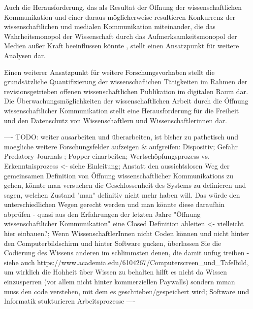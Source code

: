 Auch die Herausforderung, das als Resultat der Öffnung der wissenschaftlichen Kommunikation und einer daraus möglicherweise resultieren Konkurrenz der wissenschaftlichen und medialen Kommunikation miteinander, die das Wahrheitsmonopol der Wissenschaft durch das Aufmerksamkeitsmonopol der Medien außer Kraft beeinflussen könnte \cite{weingart_2005_wissenschaft}, stellt einen Ansatzpunkt für weitere Analysen dar.

Einen weiterer Ansatzpunkt für weitere Forschungsvorhaben stellt die grundsätzliche Quantifizierung der wissenschaflichen Tätigkeiten im Rahmen der revisionsgetrieben offenen wissenschaftlichen Publikation im digitalen Raum dar. Die Überwachungsmöglichkeiten der wissenschaftlichen Arbeit durch die Öffnung wissenschaftlicher Kommunikation stellt eine Herausforderung für die Freiheit und den Datenschutz von Wissenschaftlern und Wissenschaftlerinnen dar.

---- TODO: weiter ausarbeiten und überarbeiten, ist bisher zu pathetisch und moegliche weitere Forschungsfelder aufzeigen & aufgreifen: Dispositiv; Gefahr Predatory Journals \cite{Beall_2012}; Popper einarbeiten; Wertschöpfungsprozess vs. Erkenntnisprozess <- siehe Einleitung; Anstatt den aussichtslosen Weg der gemeinsamen Definition von Öffnung wissenschaftlicher Kommunikations zu gehen, könnte man versuchen die Geschlossenheit des Systems zu definieren und sagen, welchen Zustand "man" definitiv nicht mehr haben will. Das würde den unterschiedlichen Wegen gerecht werden und man könnte diese daraufhin abprüfen - quasi aus den Erfahrungen der letzten Jahre "Öffnung wissenschaftlicher Kommunikation" eine Closed Definition ableiten <- vielleicht hier einbauen?; Wenn WissenschaftlerInnen nicht Coden können und nicht hinter den Computerbildschirm und hinter Software gucken, überlassen Sie die Codierung des Wissens anderen im schlimmsten denen, die damit unfug treiben - siehe auch https://www.academia.edu/6104267/Computerscreen_und_Tafelbild, um wirklich die Hohheit über Wissen zu behalten hilft es nicht da Wissen einzusperren (vor allem nicht hinter kommerziellen Paywalls) sondern mman muss den code verstehen, mit dem es geschrieben/gespeichert wird; Software und Informatik stukturieren Arbeitsprozesse \cite{Warnke_2012}  ----
